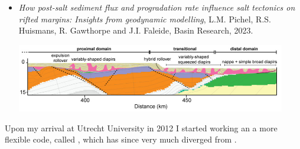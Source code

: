 \begin{itemize}
\item {\it How post-­salt sediment flux and progradation rate
influence salt tectonics on rifted margins: Insights from
geodynamic modelling},
L.M. Pichel, R.S. Huismans, R. Gawthorpe and  J.I. Faleide, Basin Research, 2023. \cite{pihg23}
\begin{center}
\includegraphics[height=3cm]{images/mycodes/pihg23_img}
\end{center}




\end{itemize}



Upon my arrival at Utrecht University in 2012 I started working an a more flexible code, called \elefant, 
which has since very much diverged from \fantom.

